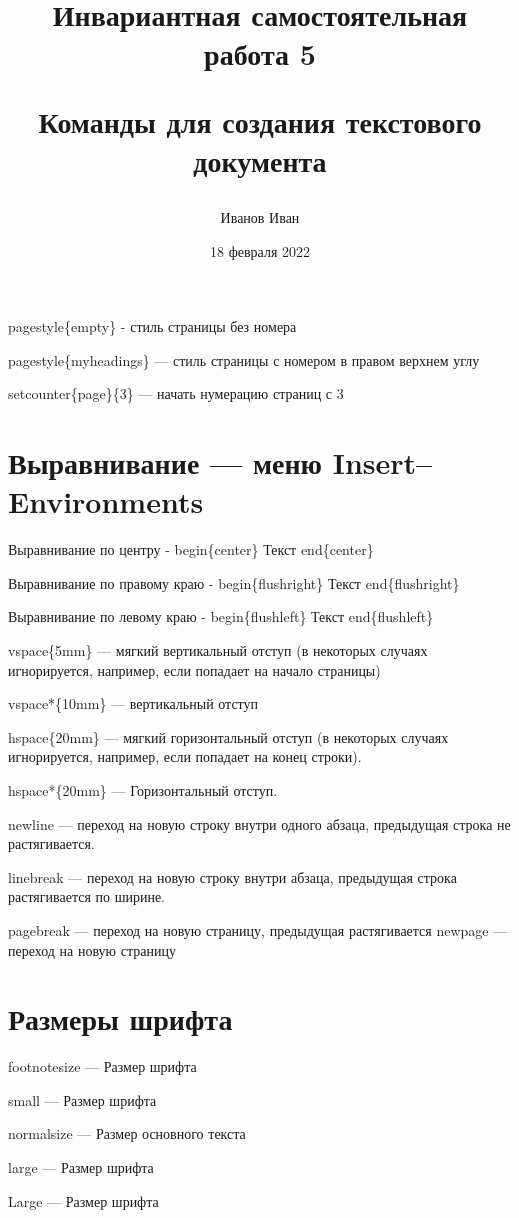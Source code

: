 \documentclass[10pt,a4paper]{article}
\title{Инвариантная самостоятельная работа 5

Команды для создания текстового документа}
\author{Иванов Иван}
\date{18 февраля 2022}
\begin{document}
\maketitle
\newpage

pagestyle\{empty\} - стиль страницы без номера

pagestyle\{myheadings\} — стиль страницы с номером в правом
верхнем углу

setcounter\{page\}\{3\} — начать нумерацию страниц с 3

\section{Выравнивание — меню Insert–Environments}

Выравнивание по центру - begin\{center\} Текст end\{center\}

Выравнивание по правому краю - begin\{flushright\} Текст end\{flushright\}

Выравнивание по левому краю - begin\{flushleft\} Текст end\{flushleft\}

vspace\{5mm\} — мягкий вертикальный отступ (в некоторых случаях
игнорируется, например, если попадает на начало страницы)

vspace*\{10mm\} — вертикальный отступ

hspace\{20mm\} — мягкий горизонтальный отступ (в некоторых
случаях игнорируется, например, если попадает на конец строки).

hspace*\{20mm\} — Горизонтальный отступ.

newline — переход на новую строку внутри одного абзаца,
предыдущая строка не растягивается.

linebreak — переход на новую строку внутри абзаца, предыдущая
строка растягивается по ширине.

pagebreak — переход на новую страницу, предыдущая растягивается
newpage — переход на новую страницу

\section{Размеры шрифта}

footnotesize — \footnotesize Размер шрифта \normalsize

small — \small Размер шрифта \normalsize

normalsize — \normalsize Размер основного текста

large — \large Размер шрифта \normalsize

Large — \large Размер шрифта \normalsize
\end{document}
